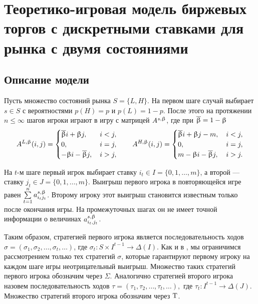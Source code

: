 \chapter{Теоретико-игровая модель биржевых торгов с дискретными ставками для
  рынка с двумя состояниями} \label{chapt1}


\section{Описание модели}
Пусть множество состояний рынка $S = \{L, H\}$. На первом шаге случай выбирает
$s \in S $ с вероятностями $p(H) = p$ и $p(L) = 1 - p$. После этого на
протяжении $n \leq \infty$ шагов игроки играют в игру с матрицей $A^{s,\upbeta}$,
где при $\overline{\upbeta} = 1-\upbeta$
\begin{equation*}
  A^{L,\upbeta}(i, j) = \begin{cases}
    \overline{\upbeta} i + \upbeta j, &\, i < j, \\
    0, &\, i = j, \\
    -\upbeta i - \overline{\upbeta} j, &\, i > j,
  \end{cases}
  \qquad
  A^{H,\upbeta}(i, j) = \begin{cases}
    \overline{\upbeta} i + \upbeta j - m, &\, i < j, \\
    0, &\, i = j, \\
    m - \upbeta i - \overline{\upbeta} j, &\, i > j.
  \end{cases}
\end{equation*}

На $t$-м шаге первый игрок выбирает ставку $i_t \in I = \{0, 1, \ldots, m\}$, а
второй --- ставку $j_t \in J = \{0, 1, \ldots, m\}$. Выигрыш первого игрока в
повторяющейся игре равен $\sum\limits_{t=1}^n a_{i_t j_t}^{s,\upbeta}$. Второму
игроку этот выигрыш становится известным только после окончания игры. На
промежуточных шагах он не имеет точной информации о величинах $a_{i_t,
  j_t}^{s,\upbeta}$.

Таким образом, стратегией первого игрока является последовательность ходов
$\sigma = (\sigma_1, \sigma_2, \ldots, \sigma_t, \ldots)$, где $\sigma_t: S
\times I^{t-1} \rightarrow \Delta(I)$. Как и в \cite{domansky07}, мы ограничимся
рассмотрением только тех стратегий $\sigma$, которые гарантируют первому игроку
на каждом шаге игры неотрицательный выигрыш. Множество таких стратегий первого
игрока обозначим через $\Sigma$. Аналогично стратегией второго игрока назовем
последовательность ходов $ \tau = (\tau_1, \tau_2, \ldots, \tau_t, \ldots), $
где $ \tau_t: I^{t-1} \rightarrow \Delta(J) $. Множество стратегий второго
игрока обозначим через $\mathrm{T}$.

